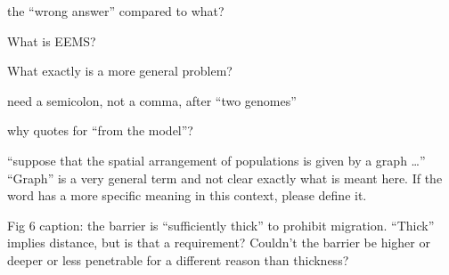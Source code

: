 
\begin{point}{\revref}
    the ``wrong answer'' compared to what?
\end{point}


\begin{point}{\revref}
    What is EEMS?
\end{point}


\begin{point}{\revref}
    What exactly is a more general problem?
\end{point}


\begin{point}{\revref}
    need a semicolon, not a comma, after ``two genomes''
\end{point}


\begin{point}{\revref}
    why quotes for ``from the model''?
\end{point}


\begin{point}{}
    ``suppose that the spatial arrangement of populations is given by a graph
    \ldots''  ``Graph'' is a very general term and not clear exactly what is meant
    here.  If the word has a more specific meaning in this context, please
    define it.
\end{point}


\begin{point}{Fig 6 caption:}
    the barrier is ``sufficiently thick'' to prohibit migration.  ``Thick''
    implies distance, but is that a requirement?  Couldn’t the barrier be
    higher or deeper or less penetrable for a different reason than thickness?
\end{point}





